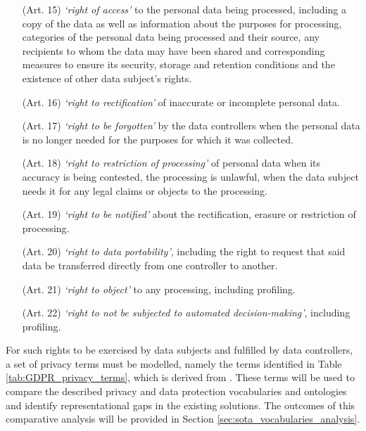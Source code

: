 \begin{enumerate}
  \item[(Art. 15)] \textit{`right of access'} to the personal data being processed, including a copy of the data as well as information about the purposes for processing, categories of the personal data being processed and their source, any recipients to whom the data may have been shared and corresponding measures to ensure its security, storage and retention conditions and the existence of other data subject's rights.
  \item[(Art. 16)] \textit{`right to rectification'} of inaccurate or incomplete personal data.
  \item[(Art. 17)] \textit{`right to be forgotten'}  by the data controllers when the personal data is no longer needed for the purposes for which it was collected.
  \item[(Art. 18)] \textit{`right to restriction of processing'} of personal data when its accuracy is being contested, the processing is unlawful, when the data subject needs it for any legal claims or objects to the processing.
  \item[(Art. 19)] \textit{`right to be notified'} about the rectification, erasure or restriction of processing.
  \item[(Art. 20)] \textit{`right to data portability'}, including the right to request that said data be transferred directly from one controller to another.
  \item[(Art. 21)] \textit{`right to object'} to any processing, including profiling.
  \item[(Art. 22)] \textit{`right to not be subjected to automated decision-making'}, including profiling.
\end{enumerate}

For such rights to be exercised by data subjects and fulfilled by data controllers, a set of privacy terms must be modelled, namely the terms identified in Table \ref{tab:GDPR_privacy_terms}, which is derived from \cite{esteves_analysis_2022}. These terms will be used to compare the described privacy and data protection vocabularies and ontologies and identify representational gaps in the existing solutions. The outcomes of this comparative analysis will be provided in Section \ref{sec:sota_vocabularies_analysis}.

